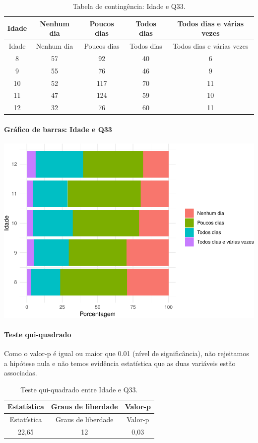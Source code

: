 \documentclass[]{article}
\let\oldparagraph\paragraph
\renewcommand{\paragraph}[1]{\oldparagraph{#1}\mbox{}}
\begin{document}
\begin{longtable}[]{@{}ccccc@{}}
\caption{\label{tab:unnamed-chunk-1154}Tabela de contingência: Idade e Q33.}\tabularnewline
\toprule
Idade & Nenhum dia & Poucos dias & Todos dias & Todos dias e várias vezes\tabularnewline
\midrule
\endfirsthead
\toprule
Idade & Nenhum dia & Poucos dias & Todos dias & Todos dias e várias vezes\tabularnewline
\midrule
\endhead
8 & 57 & 92 & 40 & 6\tabularnewline
9 & 55 & 76 & 46 & 9\tabularnewline
10 & 52 & 117 & 70 & 11\tabularnewline
11 & 47 & 124 & 59 & 10\tabularnewline
12 & 32 & 76 & 60 & 11\tabularnewline
\bottomrule
\end{longtable}

\hypertarget{gruxe1fico-de-barras-idade-e-q33}{%
\paragraph{Gráfico de barras: Idade e Q33}\label{gruxe1fico-de-barras-idade-e-q33}}

\begin{center}\includegraphics[width=0.75\linewidth]{relatorio_covid19_files/figure-latex/unnamed-chunk-1155-1} \end{center}

\hypertarget{teste-qui-quadrado-99}{%
\paragraph{Teste qui-quadrado}\label{teste-qui-quadrado-99}}

Como o valor-p é igual ou maior que 0.01 (nível de significância), não rejeitamos a hipótese nula e não temos evidência estatística que as duas variáveis estão associadas.

\begin{longtable}[]{@{}ccc@{}}
\caption{\label{tab:unnamed-chunk-1157}Teste qui-quadrado entre Idade e Q33.}\tabularnewline
\toprule
Estatística & Graus de liberdade & Valor-p\tabularnewline
\midrule
\endfirsthead
\toprule
Estatística & Graus de liberdade & Valor-p\tabularnewline
\midrule
\endhead
22,65 & 12 & 0,03\tabularnewline
\bottomrule
\end{longtable}
\end{document}
